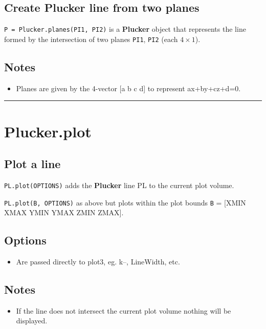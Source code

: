 \subsection*{Create Plucker line from two planes}


\texttt{P = Plucker.planes(PI1, PI2)} is a \textbf{\color{red} Plucker} object that represents
the line formed by the intersection of two planes \texttt{PI1}, \texttt{PI2} (each $4 \times 1$).


\subsection*{Notes}
\begin{itemize}
  \item Planes are given by the 4-vector [a b c d] to represent ax+by+cz+d=0.
\end{itemize}
\vspace{1.5ex}\hrule

\hypertarget{Plucker.plot}{\section*{Plucker.plot}}
\subsection*{Plot a line}


\texttt{PL.plot(OPTIONS)} adds the \textbf{\color{red} Plucker} line PL to the current plot volume.



\texttt{PL.plot(B, OPTIONS)} as above but plots within the plot bounds \texttt{B} = [XMIN
XMAX YMIN YMAX ZMIN ZMAX].


\subsection*{Options}
\begin{itemize}
  \item Are passed directly to plot3, eg. \textquotesingle k--\textquotesingle , \textquotesingle LineWidth\textquotesingle , etc.
\end{itemize}

\subsection*{Notes}
\begin{itemize}
  \item If the line does not intersect the current plot volume nothing will     be displayed.
\end{itemize}

